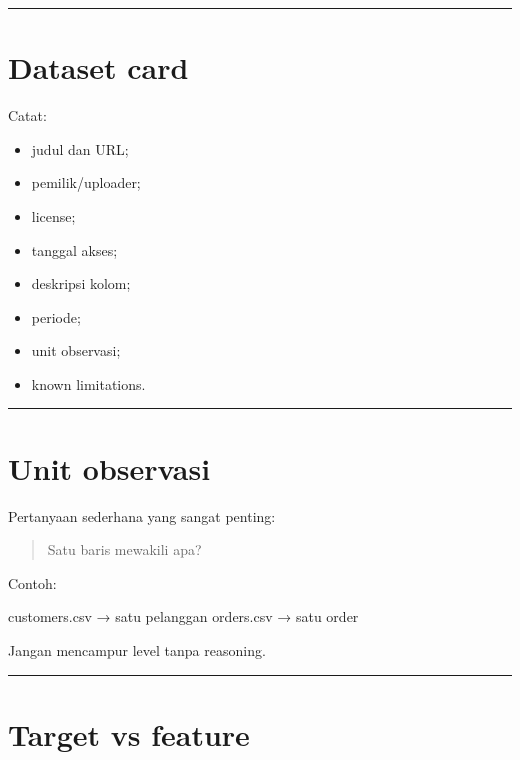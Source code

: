 \documentclass[
  indonesian,
  letterpaper,
  DIV=11,
  numbers=noendperiod]{scrreprt}
\newenvironment{Shaded}{\begin{snugshade}}{\end{snugshade}}
\newcommand{\NormalTok}[1]{\textcolor[rgb]{0.00,0.23,0.31}{#1}}
\providecommand{\tightlist}{%
  \setlength{\itemsep}{0pt}\setlength{\parskip}{0pt}}
\begin{document}
\begin{center}\rule{0.5\linewidth}{0.5pt}\end{center}

\section{Dataset card}\label{dataset-card}

Catat:

\begin{itemize}
\tightlist
\item
  judul dan URL;
\item
  pemilik/uploader;
\item
  license;
\item
  tanggal akses;
\item
  deskripsi kolom;
\item
  periode;
\item
  unit observasi;
\item
  known limitations.
\end{itemize}

\begin{center}\rule{0.5\linewidth}{0.5pt}\end{center}

\section{Unit observasi}\label{unit-observasi}

Pertanyaan sederhana yang sangat penting:

\begin{quote}
Satu baris mewakili apa?
\end{quote}

Contoh:

\begin{Shaded}
\begin{Highlighting}[]
\NormalTok{customers.csv → satu pelanggan}
\NormalTok{orders.csv    → satu order}
\end{Highlighting}
\end{Shaded}

Jangan mencampur level tanpa reasoning.

\begin{center}\rule{0.5\linewidth}{0.5pt}\end{center}

\section{Target vs feature}\label{target-vs-feature}
\end{document}
